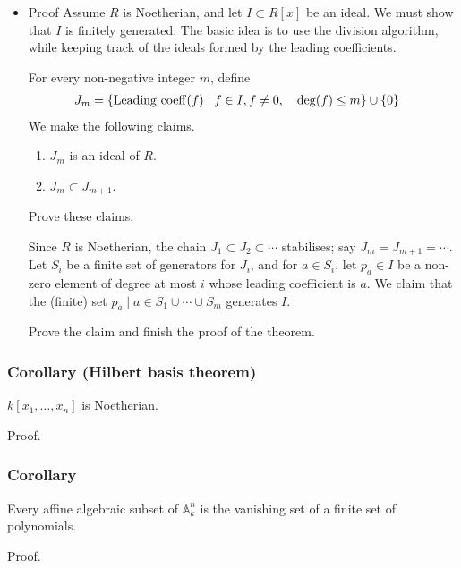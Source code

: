 \documentclass[11pt]{article}
\begin{document}
\begin{itemize}
\item Proof
\label{sec:org5337301}
Assume \(R\) is Noetherian, and let \(I \subset R[x]\) be an ideal.
We must show that \(I\) is finitely generated.
The basic idea is to use the division algorithm, while keeping track of the ideals formed by the leading coefficients.

For every non-negative integer \(m\), define
\begin{align*}
J_m &= \{{\rm Leading\ coeff} (f) \mid f \in I, f \neq 0, \quad \deg(f) \leq m\} \cup \{0\}
\end{align*}
We make the following claims.
\begin{enumerate}
\item \(J_m\) is an ideal of \(R\).
\item \(J_m \subset J_{m+1}\).
\end{enumerate}
\begin{skipped}
Prove these claims.
\end{skipped}
Since \(R\) is Noetherian, the chain \(J_1 \subset J_2 \subset \cdots\) stabilises; say \(J_m = J_{m+1} = \cdots\).
Let \(S_i\) be a finite set of generators for \(J_i\), and for \(a \in S_i\), let \(p_a \in I\) be a non-zero element of degree at most \(i\) whose leading coefficient is \(a\).
We claim that the (finite) set \(p_a \mid a \in S_1 \cup \cdots \cup S_m\) generates \(I\).    
\begin{skipped}
Prove the claim and finish the proof of the theorem.
\end{skipped}
\end{itemize}

\subsubsection{Corollary (Hilbert basis theorem)}
\label{sec:orgafe6d61}
\(k[x_1,\dots,x_n]\) is Noetherian.
\begin{skipped}
Proof.
\end{skipped}
\subsubsection{Corollary}
\label{sec:org7ec0bf8}
Every affine algebraic subset of \(\mathbb A^n_k\) is the vanishing set of a finite set of polynomials.

\begin{skipped}
Proof.
\end{skipped}
\end{document}
